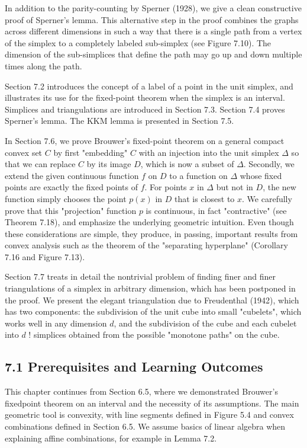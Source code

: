 \documentclass[12pt]{article}
\begin{document}
In addition to the parity-counting by Sperner (1928), we give a clean constructive proof of Sperner's lemma. This alternative step in the proof combines the graphs across different dimensions in such a way that there is a single path from a vertex of the simplex to a completely labeled sub-simplex (see Figure 7.10). The dimension of the sub-simplices that define the path may go up and down multiple times along the path.

Section 7.2 introduces the concept of a label of a point in the unit simplex, and illustrates its use for the fixed-point theorem when the simplex is an interval. Simplices and triangulations are introduced in Section 7.3. Section 7.4 proves Sperner's lemma. The KKM lemma is presented in Section 7.5.

In Section 7.6, we prove Brouwer's fixed-point theorem on a general compact convex set $C$ by first "embedding" $C$ with an injection into the unit simplex $\Delta$ so that we can replace $C$ by its image $D$, which is now a subset of $\Delta$. Secondly, we extend the given continuous function $f$ on $D$ to a function on $\Delta$ whose fixed points are exactly the fixed points of $f$. For points $x$ in $\Delta$ but not in $D$, the new function simply chooses the point $p(x)$ in $D$ that is closest to $x$. We carefully prove that this "projection" function $p$ is continuous, in fact "contractive" (see Theorem 7.18), and emphasize the underlying geometric intuition. Even though these considerations are simple, they produce, in passing, important results from convex analysis such as the theorem of the "separating hyperplane" (Corollary 7.16 and Figure 7.13).

Section 7.7 treats in detail the nontrivial problem of finding finer and finer triangulations of a simplex in arbitrary dimension, which has been postponed in the proof. We present the elegant triangulation due to Freudenthal (1942), which has two components: the subdivision of the unit cube into small "cubelets", which works well in any dimension $d$, and the subdivision of the cube and each cubelet into $d$ ! simplices obtained from the possible "monotone paths" on the cube.

\subsection*{7.1 Prerequisites and Learning Outcomes}
This chapter continues from Section 6.5, where we demonstrated Brouwer's fixedpoint theorem on an interval and the necessity of its assumptions. The main geometric tool is convexity, with line segments defined in Figure 5.4 and convex combinations defined in Section 6.5. We assume basics of linear algebra when explaining affine combinations, for example in Lemma 7.2.
\end{document}
